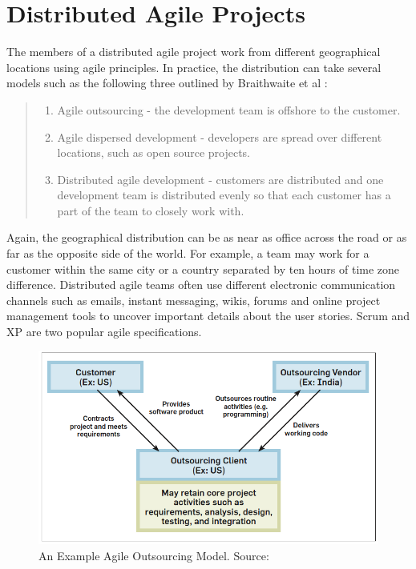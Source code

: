 \section{Distributed Agile Projects}
The members of a distributed agile project work from different geographical locations using agile principles. In practice, the distribution can take several models such as the following three outlined by Braithwaite et al \cite{xp_expanded}:

\begin{quote}
\begin{enumerate}
	\item Agile outsourcing - the development team is offshore to the customer.
	\item Agile dispersed development - developers are spread over different locations, such as open source projects.
	\item Distributed agile development - customers are distributed and one development team is distributed evenly so that each customer has a part of the team to closely work with.
\end{enumerate}
\end{quote}

Again, the geographical distribution can be as near as office across the road or as far as the opposite side of the world. For example, a team may work for a customer within the same city or a country separated by ten hours of time zone difference. Distributed agile teams often use different electronic communication channels such as emails, instant messaging, wikis, forums and online project management tools to uncover important details about the user stories. Scrum and XP are two popular agile specifications.

\begin{figure}[bt]
	\centering
	\includegraphics[width=\textwidth]{Distributed.png}
    \caption{An Example Agile Outsourcing Model. Source: \cite{modified_agile}}
	\label{fig:distributed}
\end{figure}

